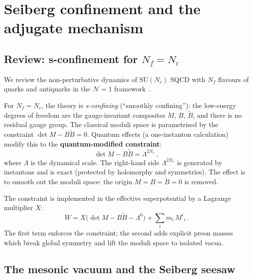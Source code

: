 \documentclass[aps,prd,twocolumn,showpacs,preprintnumbers,superscriptaddress,floatfix]{revtex4-2}
\newcommand{\SU}{\mathrm{SU}}
\newcommand{\Nf}{N_{\!f}}
\newcommand{\Nc}{N_{\!c}}
\begin{document}
\section{Seiberg confinement and the adjugate mechanism}
\label{sec:seiberg}

\subsection{Review: s-confinement for $\Nf = \Nc$}

We review the non-perturbative dynamics of $\SU(\Nc)$ SQCD with
$\Nf$ flavours of quarks and antiquarks in the $\mathcal{N}{=}1$
framework~\cite{Seiberg:1994bz,Tong:SUSY}.

For $\Nf = \Nc$, the theory is \emph{s-confining} (``smoothly
confining''): the low-energy degrees of freedom are the
gauge-invariant composites $M$, $B$, $\tilde{B}$, and there is
no residual gauge group.
The classical moduli space is parametrised by the constraint
$\det M - B\tilde{B} = 0$.
Quantum effects (a one-instanton calculation) modify this to the
\textbf{quantum-modified constraint}:
\begin{equation}
  \det M - B\tilde{B} = \Lambda^{2\Nc}\,,
  \label{eq:constraint}
\end{equation}
where $\Lambda$ is the dynamical scale.
The right-hand side $\Lambda^{2\Nc}$ is generated by instantons
and is exact (protected by holomorphy and symmetries).
The effect is to smooth out the moduli space: the origin
$M = B = \tilde{B} = 0$ is removed.

The constraint is implemented in the effective superpotential by
a Lagrange multiplier $X$:
\begin{equation}
  W = X\bigl(\det M - B\tilde{B} - \Lambda^6\bigr)
    + \sum_i m_i\,M^i{}_i\,.
  \label{eq:Wtot}
\end{equation}
The first term enforces the constraint; the second adds explicit
preon masses which break global symmetry and lift the moduli
space to isolated vacua.


\subsection{The mesonic vacuum and the Seiberg seesaw}
\end{document}
